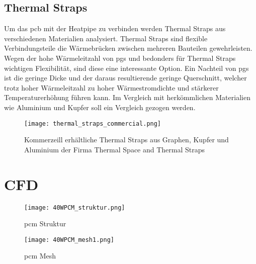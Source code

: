 \subsection{Thermal Straps}\label{thermalstraps}
Um das \ac{pcb} mit der Heatpipe zu verbinden werden Thermal Straps aus verschiedenen Materialien analysiert.
Thermal Straps sind flexible Verbindungsteile die Wärmebrücken zwischen mehreren Bauteilen gewehrleisten.
Wegen der hohe Wärmeleitzahl von \ac{pgs} und bedonders für Thermal Straps wichtigen Flexibilität, sind diese eine interessante Option.
Ein Nachteil von \ac{pgs} ist die geringe Dicke und der daraus resultierende geringe Querschnitt, welcher trotz hoher Wärmeleitzahl zu hoher Wärmestromdichte und stärkerer Temperaturerhöhung führen kann.
Im Vergleich mit herkömmlichen Materialien wie Aluminium und Kupfer soll ein Vergleich gezogen werden.
\begin{figure}[H]
  \centering
  \texttt{[image: thermal\_straps\_commercial.png]}
  \caption{Kommerzeill erhältliche Thermal Straps aus Graphen, Kupfer und Aluminium der Firma Thermal Space and Thermal Straps}\label{fig:thermalstraps_commercial}
\end{figure}
\newpage
\section{CFD}\label{cfd}
\begin{figure}[H]
  \centering
  \texttt{[image: 40WPCM\_struktur.png]}
  \caption{\ac{pcm} Struktur}\label{pcmstruktur}
\end{figure}
\begin{figure}
  \texttt{[image: 40WPCM\_mesh1.png]}
  \caption{\ac{pcm} Mesh}\label{pcmmesh}
\end{figure}
